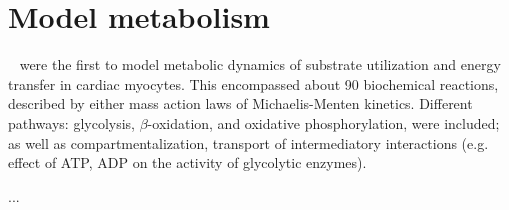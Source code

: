 
\chapter{Model metabolism}
\label{chap:model-metabolism}

~\citep{achs1977,achs1977b} were the first to model metabolic dynamics
of substrate utilization and energy transfer in cardiac myocytes. This
encompassed about 90 biochemical reactions, described by either mass
action laws of Michaelis-Menten kinetics.  Different pathways:
glycolysis, $\beta$-oxidation, and oxidative phosphorylation, were
included; as well as compartmentalization, transport of intermediatory
interactions (e.g. effect of ATP, ADP on the activity of glycolytic
enzymes). 

...~\citep{winslow2011}




